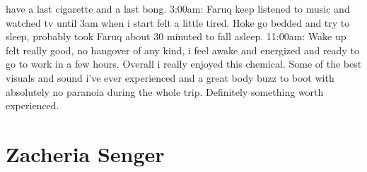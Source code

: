 \documentclass[12pt]{book}
\begin{document}
have a last cigarette and a last bong. 3:00am: Faruq keep listened to music and watched tv until 3am when i start felt a little tired. Hoke go bedded and try to sleep, probably took Faruq about 30 minuted to fall asleep. 11:00am: Wake up felt really good, no hangover of any kind, i feel awake and energized and ready to go to work in a few hours. Overall i really enjoyed this chemical. Some of the best visuals and sound i've ever experienced and a great body buzz to boot with absolutely no paranoia during the whole trip. Definitely something worth experienced.



\chapter{Zacheria Senger}
\end{document}
